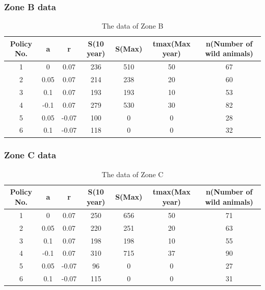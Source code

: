 \documentclass{mcmthesis}
\numberwithin{figure}{section}
\numberwithin{table}{section}
\numberwithin{equation}{section}
\begin{document}
\subsubsection{Zone B data}
\begin{table}[htbp]
	\caption{The data of Zone B}
	\label{T 6.2}
	\begin{tabular}{ccccccc}
	\hline
	Policy No. & a    & r     & S(10 year) & S(Max) & tmax(Max year) & n(Number of wild animals) \\ \hline
	1          & 0    & 0.07  & 236        & 510    & 50             & 67                        \\
	2          & 0.05 & 0.07  & 214        & 238    & 20             & 60                        \\
	3          & 0.1  & 0.07  & 193        & 193    & 10             & 53                        \\
	4          & -0.1 & 0.07  & 279        & 530    & 30             & 82                        \\
	5          & 0.05 & -0.07 & 100        & 0      & 0              & 28                        \\
	6          & 0.1  & -0.07 & 118        & 0      & 0              & 32                        \\ \hline
	\end{tabular}
\end{table}

\subsubsection{Zone C data}
\begin{table}[!]
	\caption{The data of Zone C}
	\label{T 6.3}
	\begin{tabular}{ccccccc}
	\hline
	Policy No. & a    & r     & S(10 year) & S(Max) & tmax(Max year) & n(Number of wild animals) \\ \hline
	1          & 0    & 0.07  & 250        & 656    & 50             & 71                        \\
	2          & 0.05 & 0.07  & 220        & 251    & 20             & 63                        \\
	3          & 0.1  & 0.07  & 198        & 198    & 10             & 55                        \\
	4          & -0.1 & 0.07  & 310        & 715    & 37            & 90                        \\
	5          & 0.05 & -0.07 & 96         & 0      & 0              & 27                        \\
	6          & 0.1  & -0.07 & 115        & 0      & 0              & 31                        \\ \hline
	\end{tabular}
\end{table}
\end{document}

